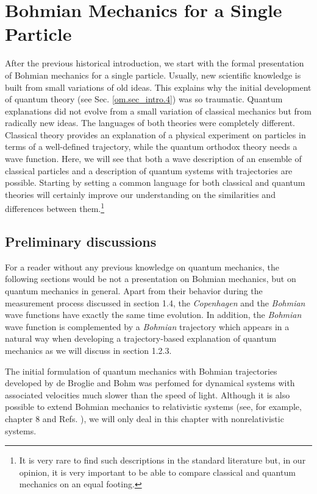 \documentclass[onecolumn,nofootinbib, secnumarabic, amsmath, nobibnotes,11pt,aps,pra]{revtex4-1}
\newcommand{\sref}[1]{Sec. \ref{#1}}
\begin{document}
\vspace*{-1pc}
\section{Bohmian Mechanics for a Single Particle}\label{om.sec_single}

After the previous historical introduction, we start with the formal
presentation of Bohmian mechanics for a single particle. Usually,
new scientific knowledge is built from small variations of old
ideas. This explains why the initial development of quantum theory
(see \sref{om.sec_intro.4}) was so traumatic. Quantum explanations
did not evolve from a small variation of classical mechanics but
from radically new ideas. The languages of both theories were
completely different. Classical theory provides an explanation of a
physical experiment on particles in terms of a well-defined trajectory,
while the quantum orthodox theory needs a wave function. Here, we
will see that both a wave description of an ensemble of classical
particles and a description of quantum systems with trajectories are
possible. Starting by setting a common language for both classical
and quantum theories will certainly improve our understanding on the
similarities and differences between them.\footnote{It is very rare
to find such descriptions in the standard literature but, in our
opinion, it is very important to be able to compare classical and
quantum mechanics on an equal footing.}

\subsection{Preliminary discussions}\label{om.sec_single.1}

For a reader without any previous knowledge on quantum mechanics,
the following sections would be not a presentation on Bohmian
mechanics, but on quantum mechanics in general. Apart from their
behavior during the measurement process discussed in section 1.4,
the \textit{Copenhagen} and the \textit{Bohmian} wave functions have exactly the
same time evolution. In addition, the \textit{Bohmian} wave function is
complemented by a \textit{Bohmian} trajectory which appears in a natural
way when developing a trajectory-based explanation of quantum
mechanics as we will discuss in section 1.2.3.


The initial formulation of quantum mechanics with Bohmian
trajectories developed by de Broglie and Bohm was perfomed for dynamical
systems with associated velocities much slower than the speed of
light. Although it is also possible to extend Bohmian mechanics to
relativistic systems (see, for example, chapter 8 and Refs.
\cite{om.extra6,om.extra7,om.ward}), we will only deal in this
chapter with nonrelativistic systems.
\end{document}
